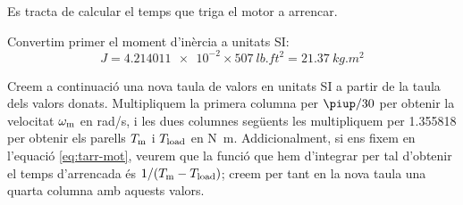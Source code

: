 \begin{exemple}
 Es tracta de calcular el temps que triga el motor a arrencar.

Convertim primer el moment d'inèrcia a unitats SI:
\[
    J = \num{4,214011e-2}\times\SI{507}{lb.ft^2} = \SI{21,37}{kg.m^2}
\]

Creem a continuació una nova taula de valors en unitats SI a partir de la taula dels valors donats. Multipliquem la primera columna per $\piup/30$ per obtenir la velocitat $\omega_\mathrm{m}$ en \si{rad/s}, i les dues columnes següents les multipliquem per \num{1,355818} per obtenir els parells $T_\mathrm{m}$ i $T_\mathrm{load}$ en \si{N.m}. Addicionalment, si ens fixem en l'equació \eqref{eq:tarr-mot}, veurem que la funció que hem d'integrar per tal d'obtenir el temps d'arrencada és $1/(T_\mathrm{m}-T_\mathrm{load})$; creem per tant en la nova taula una quarta columna amb aquests valors.


\end{exemple}
